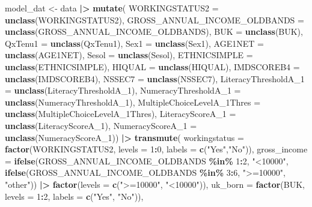 \documentclass[
]{article}
\newenvironment{Shaded}{\begin{snugshade}}{\end{snugshade}}
\newcommand{\AttributeTok}[1]{\textcolor[rgb]{0.13,0.29,0.53}{#1}}
\newcommand{\DecValTok}[1]{\textcolor[rgb]{0.00,0.00,0.81}{#1}}
\newcommand{\FunctionTok}[1]{\textcolor[rgb]{0.13,0.29,0.53}{\textbf{#1}}}
\newcommand{\NormalTok}[1]{#1}
\newcommand{\OtherTok}[1]{\textcolor[rgb]{0.56,0.35,0.01}{#1}}
\newcommand{\SpecialCharTok}[1]{\textcolor[rgb]{0.81,0.36,0.00}{\textbf{#1}}}
\newcommand{\StringTok}[1]{\textcolor[rgb]{0.31,0.60,0.02}{#1}}
\begin{document}
\begin{Shaded}
\begin{Highlighting}[]
\NormalTok{model\_dat }\OtherTok{\textless{}{-}}
\NormalTok{  data }\SpecialCharTok{|\textgreater{}}
  \FunctionTok{mutate}\NormalTok{(}
    \AttributeTok{WORKINGSTATUS2 =} \FunctionTok{unclass}\NormalTok{(WORKINGSTATUS2),}
    \AttributeTok{GROSS\_ANNUAL\_INCOME\_OLDBANDS =} \FunctionTok{unclass}\NormalTok{(GROSS\_ANNUAL\_INCOME\_OLDBANDS),}
    \AttributeTok{BUK =} \FunctionTok{unclass}\NormalTok{(BUK),}
    \AttributeTok{QxTenu1 =} \FunctionTok{unclass}\NormalTok{(QxTenu1),}
    \AttributeTok{Sex1 =} \FunctionTok{unclass}\NormalTok{(Sex1),}
    \AttributeTok{AGE1NET =} \FunctionTok{unclass}\NormalTok{(AGE1NET),}
    \AttributeTok{Sesol =} \FunctionTok{unclass}\NormalTok{(Sesol),}
    \AttributeTok{ETHNICSIMPLE =} \FunctionTok{unclass}\NormalTok{(ETHNICSIMPLE),}
    \AttributeTok{HIQUAL =} \FunctionTok{unclass}\NormalTok{(HIQUAL),}
    \AttributeTok{IMDSCOREB4 =} \FunctionTok{unclass}\NormalTok{(IMDSCOREB4),}
    \AttributeTok{NSSEC7 =} \FunctionTok{unclass}\NormalTok{(NSSEC7),}
    \AttributeTok{LiteracyThresholdA\_1 =} \FunctionTok{unclass}\NormalTok{(LiteracyThresholdA\_1),}
    \AttributeTok{NumeracyThresholdA\_1 =} \FunctionTok{unclass}\NormalTok{(NumeracyThresholdA\_1),}
    \AttributeTok{MultipleChoiceLevelA\_1Thres =} \FunctionTok{unclass}\NormalTok{(MultipleChoiceLevelA\_1Thres),}
    \AttributeTok{LiteracyScoreA\_1 =} \FunctionTok{unclass}\NormalTok{(LiteracyScoreA\_1),}
    \AttributeTok{NumeracyScoreA\_1 =} \FunctionTok{unclass}\NormalTok{(NumeracyScoreA\_1)) }\SpecialCharTok{|\textgreater{}}
  \FunctionTok{transmute}\NormalTok{(}
    \AttributeTok{workingstatus =} \FunctionTok{factor}\NormalTok{(WORKINGSTATUS2, }\AttributeTok{levels =} \DecValTok{1}\SpecialCharTok{:}\DecValTok{0}\NormalTok{, }\AttributeTok{labels =} \FunctionTok{c}\NormalTok{(}\StringTok{"Yes"}\NormalTok{,}\StringTok{"No"}\NormalTok{)),}
    \AttributeTok{gross\_income =}
      \FunctionTok{ifelse}\NormalTok{(GROSS\_ANNUAL\_INCOME\_OLDBANDS }\SpecialCharTok{\%in\%} \DecValTok{1}\SpecialCharTok{:}\DecValTok{2}\NormalTok{,}
             \StringTok{"\textless{}10000"}\NormalTok{,}
             \FunctionTok{ifelse}\NormalTok{(GROSS\_ANNUAL\_INCOME\_OLDBANDS }\SpecialCharTok{\%in\%} \DecValTok{3}\SpecialCharTok{:}\DecValTok{6}\NormalTok{,}
                    \StringTok{"\textgreater{}=10000"}\NormalTok{, }\StringTok{"other"}\NormalTok{)) }\SpecialCharTok{|\textgreater{}}
      \FunctionTok{factor}\NormalTok{(}\AttributeTok{levels =} \FunctionTok{c}\NormalTok{(}\StringTok{"\textgreater{}=10000"}\NormalTok{, }\StringTok{"\textless{}10000"}\NormalTok{)),}
    \AttributeTok{uk\_born =} \FunctionTok{factor}\NormalTok{(BUK, }\AttributeTok{levels =} \DecValTok{1}\SpecialCharTok{:}\DecValTok{2}\NormalTok{, }\AttributeTok{labels =} \FunctionTok{c}\NormalTok{(}\StringTok{"Yes"}\NormalTok{, }\StringTok{"No"}\NormalTok{)),}

\end{Highlighting}
\end{Shaded}
\end{document}
